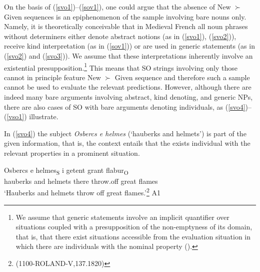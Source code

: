 \documentclass[output=paper,modfonts,nonflat]{langsci/langscibook}
\begin{document}
On the basis of (\ref{svo1})--(\ref{sov1}), one could argue that the absence of New $\succ$ Given sequences is an epiphenomenon of the sample involving bare nouns only. Namely, it is theoretically conceivable that in Medieval French all noun phrases without determiners either denote abstract notions (as in (\ref{svo1}), (\ref{svo2})), receive kind interpretation (as in (\ref{sov1})) or are used in generic statements (as in (\ref{svo2}) and (\ref{svo3})). We assume that these interpretations inherently involve an existential presupposition.\footnote{We assume that generic statements involve an implicit quantifier over situations coupled with a presupposition of the non-emptyness of its domain, that is, that there exist situations accessible from the evaluation situation in which there are individuals with the nominal property (\citet{Lee:1995,vonFintel:1996}).} This means that SO strings involving only those cannot in principle feature New $\succ$ Given sequence and therefore such a sample cannot be used to evaluate the relevant predictions. However, although there are indeed many bare arguments involving abstract, kind denoting, and generic NPs, there are also cases of SO with bare arguments denoting individuals, as (\ref{svo4})--(\ref{vso1}) illustrate. %

In (\ref{svo4}) the subject {\itshape Osbercs e helmes} (`hauberks and helmets') is part of the given information, that is, the context entails that the exists individual with the relevant properties in a prominent situation.

\ea
\gll Osbercs e helmes\textsubscript{S} i getent grant flabur\textsubscript{O}\\
hauberks and helmets there throw.off great flames\\
\glt `Hauberks and helmets throw off great flames.'\footnote{{(1100-ROLAND-V,137.1820)}}\label{svo4} \hfill A1
\z


\end{document}
